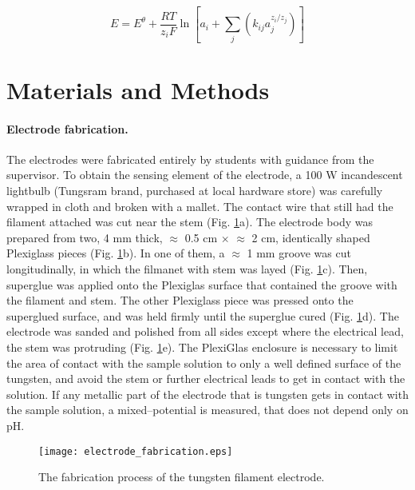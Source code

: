 \documentclass[manuscript=article, journal=jceda8]{achemso}
\begin{document}
\begin{equation}
E=E^\theta + \frac{RT}{z_iF} \ln \left [ a_i + \sum_{j} \left ( k_{ij}a_j^{z_i/z_j} \right ) \right ]
\end{equation}


\section{Materials and Methods}
\paragraph{Electrode fabrication.}

The electrodes were fabricated entirely by students with guidance from the supervisor. To obtain the sensing element of the electrode, a 100 W incandescent lightbulb (Tungsram brand, purchased at local hardware store) was carefully wrapped in cloth and broken with a mallet. The contact wire that still had the filament attached was cut near the stem (Fig. \ref{fig:fabrication}a). The electrode body was prepared from two, 4 mm thick, $\approx$ 0.5 cm $\times$ $\approx$ 2 cm, identically shaped Plexiglass pieces (Fig. \ref{fig:fabrication}b). In one of them, a $\approx$ 1 mm groove was cut longitudinally, in which the filmanet with stem was layed (Fig. \ref{fig:fabrication}c). Then, superglue was applied onto the Plexiglas surface that contained the groove with the filament and stem. The other Plexiglass piece was pressed onto the superglued surface, and was held firmly until the superglue cured (Fig. \ref{fig:fabrication}d). The electrode was sanded and polished from all sides except where the electrical lead, the stem was protruding (Fig. \ref{fig:fabrication}e). The PlexiGlas enclosure is necessary to limit the area of contact with the sample solution to only a well defined surface of the tungsten, and avoid the stem or further electrical leads to get in contact with the solution. If any metallic part of the electrode that is tungsten gets in contact with the sample solution, a mixed--potential is measured, that does not depend only on pH.

\begin{figure}
\centering
\texttt{[image: electrode\_fabrication.eps]}
\caption{The fabrication process of the tungsten filament electrode. }
\label{fig:fabrication}
\end{figure}
\end{document}
